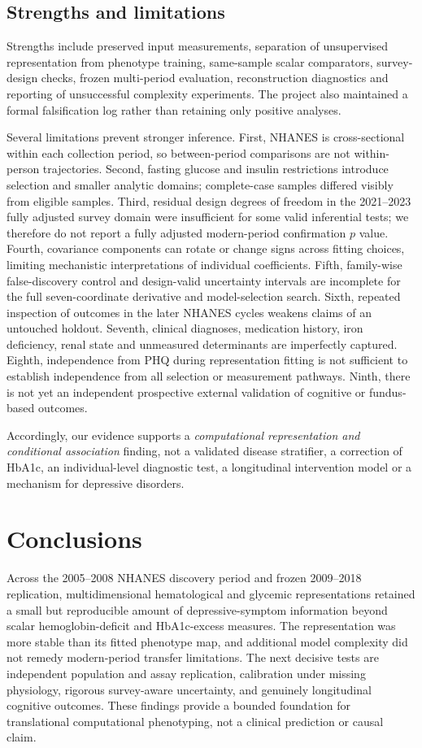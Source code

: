 \documentclass[11pt,a4paper]{article}
\begin{document}
\subsection{Strengths and limitations}
Strengths include preserved input measurements, separation of unsupervised representation from phenotype training, same-sample scalar comparators, survey-design checks, frozen multi-period evaluation, reconstruction diagnostics and reporting of unsuccessful complexity experiments. The project also maintained a formal falsification log rather than retaining only positive analyses.

Several limitations prevent stronger inference. First, NHANES is cross-sectional within each collection period, so between-period comparisons are not within-person trajectories. Second, fasting glucose and insulin restrictions introduce selection and smaller analytic domains; complete-case samples differed visibly from eligible samples. Third, residual design degrees of freedom in the 2021--2023 fully adjusted survey domain were insufficient for some valid inferential tests; we therefore do not report a fully adjusted modern-period confirmation $p$ value. Fourth, covariance components can rotate or change signs across fitting choices, limiting mechanistic interpretations of individual coefficients. Fifth, family-wise false-discovery control and design-valid uncertainty intervals are incomplete for the full seven-coordinate derivative and model-selection search. Sixth, repeated inspection of outcomes in the later NHANES cycles weakens claims of an untouched holdout. Seventh, clinical diagnoses, medication history, iron deficiency, renal state and unmeasured determinants are imperfectly captured. Eighth, independence from PHQ during representation fitting is not sufficient to establish independence from all selection or measurement pathways. Ninth, there is not yet an independent prospective external validation of cognitive or fundus-based outcomes.

Accordingly, our evidence supports a \emph{computational representation and conditional association} finding, not a validated disease stratifier, a correction of HbA1c, an individual-level diagnostic test, a longitudinal intervention model or a mechanism for depressive disorders.

\section{Conclusions}
Across the 2005--2008 NHANES discovery period and frozen 2009--2018 replication, multidimensional hematological and glycemic representations retained a small but reproducible amount of depressive-symptom information beyond scalar hemoglobin-deficit and HbA1c-excess measures. The representation was more stable than its fitted phenotype map, and additional model complexity did not remedy modern-period transfer limitations. The next decisive tests are independent population and assay replication, calibration under missing physiology, rigorous survey-aware uncertainty, and genuinely longitudinal cognitive outcomes. These findings provide a bounded foundation for translational computational phenotyping, not a clinical prediction or causal claim.
\end{document}
